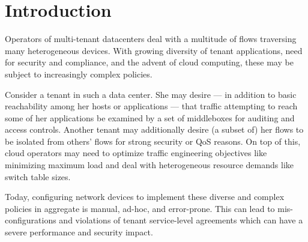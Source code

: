 \section{Introduction}

Operators of multi-tenant datacenters deal with a multitude of
flows traversing many heterogeneous devices. With growing
diversity of tenant applications, need for security and compliance,
and the advent of cloud computing, these may be subject to
increasingly complex policies.

Consider a tenant in such a data center. She may desire --- in addition
to basic reachability among her hosts or applications --- that traffic
attempting to reach some of her applications be examined by a set of
middleboxes for auditing and access controls. Another tenant may
additionally desire (a subset of) her flows to be isolated from
others' flows for strong security or QoS reasons. On top of this,
cloud operators may need to optimize traffic engineering objectives
like minimizing maximum load 
and deal with heterogeneous resource demands like switch table 
sizes. 

Today, configuring network devices to implement these diverse
and complex policies in aggregate is manual, ad-hoc, and error-prone. 
This can lead to mis-configurations and violations of tenant
service-level agreements which can have a severe performance and
security impact.



